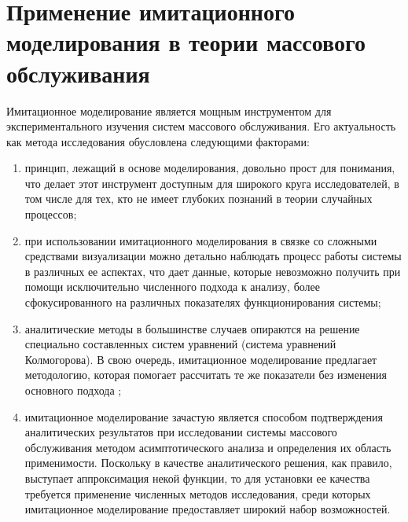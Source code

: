 \section {Применение имитационного моделирования в теории массового обслуживания}
Имитационное моделирование \cite{задорожный2011методы} является мощным инструментом для экспериментального изучения систем массового обслуживания. Его актуальность как метода исследования обусловлена следующими факторами:
\begin{enumerate}
	\item принцип, лежащий в основе моделирования, довольно прост для понимания, что делает этот инструмент доступным для широкого круга исследователей, в том числе для тех, кто не имеет глубоких познаний в теории случайных процессов;
	\item при использовании имитационного моделирования в связке со сложными средствами визуализации можно детально наблюдать процесс работы системы в различных ее аспектах, что дает данные, которые невозможно получить при помощи исключительно численного подхода к анализу, более сфокусированного на различных показателях функционирования системы; 
	\item аналитические методы в большинстве случаев опираются на решение специально составленных систем уравнений (система уравнений Колмогорова). В свою очередь, имитационное моделирование предлагает методологию, которая помогает рассчитать те же показатели без изменения основного подхода \cite{glynn1988simulation};
	\item имитационное моделирование зачастую является способом подтверждения аналитических результатов при исследовании системы массового обслуживания методом асимптотического анализа и определения их область применимости. Поскольку в качестве аналитического решения, как правило, выступает аппроксимация некой функции, то для установки ее качества требуется применение численных методов исследования, среди которых имитационное моделирование предоставляет широкий набор возможностей.
\end{enumerate}

